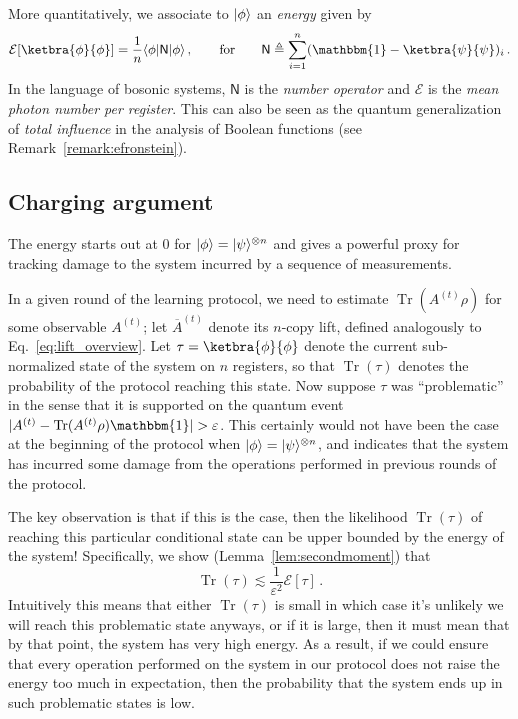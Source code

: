 \documentclass[10pt]{article}
\DeclarePairedDelimiter{\bra}{\langle}{\rvert}%
\DeclarePairedDelimiter{\ket}{\lvert}{\rangle}%
\renewcommand{\epsilon}{\varepsilon}
\newcommand{\energy}{\mathcal{E}}
\DeclareMathOperator{\Tr}{Tr}
\newcommand{\Id}{\mathbbm{1}}
\begin{document}
More quantitatively, we associate to $\ket{\phi}$ an \emph{energy} given by
\begin{equation}
    \energy[\ketbra{\phi}{\phi}] = \frac{1}{n}\bra{\phi}\mathsf{N}\ket{\phi}\,, \qquad \text{for} \qquad \mathsf{N} \triangleq \sum^n_{i=1} (\Id - \ketbra{\psi}{\psi})_i\,.
\end{equation}
In the language of bosonic systems, $\mathsf{N}$ is the \emph{number operator} and $\energy$ is the \emph{mean photon number per register}. This can also be seen as the quantum generalization of \emph{total influence} in the analysis of Boolean functions (see Remark~\ref{remark:efronstein}).

\subsection{Charging argument} 

The energy starts out at $0$ for $\ket{\phi} = \ket{\psi}^{\otimes n}$ and gives a powerful proxy for tracking damage to the system incurred by a sequence of measurements. 

In a given round of the learning protocol, we need to estimate $\Tr(A^{(t)}\rho)$ for some observable $A^{(t)}$; let $\overline{A}^{(t)}$ denote its $n$-copy lift, defined analogously to Eq.~\eqref{eq:lift_overview}. Let $\tau = \ketbra{\phi}{\phi}$ denote the current sub-normalized state of the system on $n$ registers, so that $\Tr(\tau)$ denotes the probability of the protocol reaching this state. 
Now suppose $\tau$ was ``problematic'' in the sense that it is supported on the quantum event $|A^{(t)} - \Tr(A^{(t)}\rho)\Id| > \epsilon$.
This certainly would not have been the case at the beginning of the protocol when $\ket{\phi} = \ket{\psi}^{\otimes n}$, and indicates that the system has incurred some damage from the operations performed in previous rounds of the protocol.

The key observation is that if this is the case, then the likelihood $\Tr(\tau)$ of reaching this particular conditional state can be upper bounded by the energy of the system! Specifically, we show (Lemma~\ref{lem:secondmoment}) that 
\begin{equation}
    \Tr(\tau) \lesssim \frac{1}{\epsilon^2} \energy[\tau]\,.\label{eq:charge_overview}
\end{equation}
Intuitively this means that either $\Tr(\tau)$ is small in which case it's unlikely we will reach this problematic state anyways, or if it is large, then it must mean that by that point, the system has very high energy. As a result, if we could ensure that every operation performed on the system in our protocol does not raise the energy too much in expectation, then the probability that the system ends up in such problematic states is low.
\end{document}
